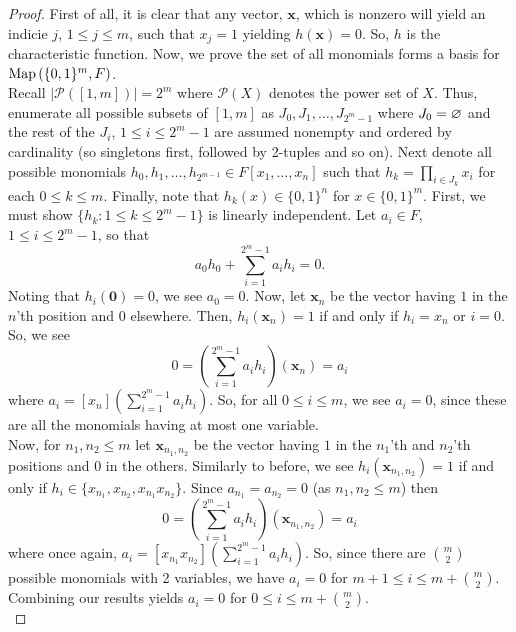 \begin{proof}
	First of all, it is clear that any vector, \(\textbf{x}\), which is nonzero will yield an indicie \(j\), \(1 \le j \le m\), such that \(x_{j} = 1\) yielding \(h\left( \textbf{x} \right) = 0\). So, \(h\) is the characteristic function. Now, we prove the set of all monomials forms a basis for \(\operatorname{Map}\left( \{0, 1\} ^{m}, F \right) \).\\
	Recall \(\left| \mathscr{P}\left( \left[ 1, m \right]  \right)  \right| = 2^{m} \) where \(\mathscr{P}\left( X \right) \) denotes the power set of \(X\). Thus, enumerate all possible subsets of \(\left[ 1, m \right] \) as \(J_0, J_1, \ldots, J_{2^{m}-1}\) where \(J_0 = \varnothing\) and the rest of the \(J_{i}\), \(1 \le i \le 2^{m}-1\) are assumed nonempty and ordered by cardinality (so singletons first, followed by 2-tuples and so on). Next denote all possible monomials \(h_0, h_1, \ldots, h_{2^{m-1}} \in F\left[ x_1, \ldots , x_{n} \right] \) such that \(h_{k} = \prod_{i \in J_{k}}x_{i}\) for each \(0 \le k \le m\). Finally, note that \(h_{k}\left( x \right) \in \{0, 1\}^{n} \) for \(x \in \{0, 1\} ^{m}\). First, we must show \(\{h_{k} : 1 \le k \le 2^{m}-1\} \) is linearly independent. Let \(a_{i} \in F\), \(1 \le i \le 2^{m}-1\), so that \[
	a_0h_0 + \sum_{i= 1}^{2^{m}-1} a_{i}h_{i} = 0
	.\]
	Noting that \(h_{i} \left( \textbf{0} \right) = 0 \), we see \(a_0 = 0\). Now, let \(\textbf{x}_{n}\) be the vector having \(1\) in the \(n\)'th position and \(0\) elsewhere. Then, \(h_{i} \left( \textbf{x}_{n} \right) = 1 \) if and only if \(h_{i} = x_{n}\) or \( i = 0\). So, we see \[
		0 = \left( \sum_{i= 1}^{2^{m}-1} a_{i} h_{i} \right)\left( \textbf{x}_{n} \right) = a_{i}
	\] where \(a_{i} = \left[ x_{n} \right] \left( \sum_{i= 1}^{2^{m}-1} a_i h_{i} \right)  \). So, for all \(0  \le i \le m\), we see \(a_{i} = 0\), since these are all the monomials having at most one variable.\\
Now, for \(n_1, n_2 \le m\) let \(\textbf{x}_{n_1, n_2}\) be the vector having \(1\) in the \(n_1\)'th and \(n_2\)'th positions and \(0\) in the others. Similarly to before, we see \(h_{i}\left( \textbf{x}_{n_1, n_2} \right) = 1 \) if and only if \(h_{i} \in \{x_{n_1}, x_{n_2}, x_{n_1}x_{n_2}\} \). Since \(a_{n_1} = a_{n_2} = 0\) (as \(n_1, n_2 \le m\)) then \[
		0 = \left( \sum_{i= 1}^{2^{m}-1} a_{i}h_{i} \right) \left( \textbf{x}_{n_1, n_2} \right) = a_{i}
	\]  where once again, \(a_{i} = \left[ x_{n_1}x_{n_2} \right] \left( \sum_{i= 1}^{2^{m}-1} a_{i}h_{i} \right) \). So, since there are \(\binom{m}{2}\) possible monomials with 2 variables, we have \(a_{i} = 0\) for \(m+1 \le i \le m + \binom{m}{2}\). Combining our results yields \(a_{i} = 0\) for \(0 \le i \le m +  \binom{m}{2}\).\\

\end{proof}
